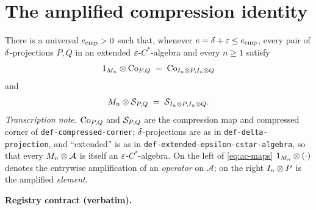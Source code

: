 \section{The amplified compression identity}\label{sec:compcb-amplified-compression}

\begin{lemma}\label{lem:compcb-amplified-compression}
There is a universal $e_{\mathrm{cmp}}>0$ such that, whenever
$e=\delta+\varepsilon\le e_{\mathrm{cmp}}$, every pair of $\delta$-projections $P,Q$ in
an extended $\varepsilon$-$C^*$-algebra and every $n\ge1$ satisfy
\begin{equation}\label{eq:ac-maps}
  1_{M_{n}}\otimes\mathrm{Co}_{P,Q}\;=\;\mathrm{Co}_{I_{n}\otimes P,I_{n}\otimes Q}
\end{equation}
and
\begin{equation}\label{eq:ac-corners}
  M_{n}\otimes \mathcal S_{P,Q}\;=\;\mathcal S_{I_{n}\otimes P,I_{n}\otimes Q} .
\end{equation}
\emph{Transcription note.} $\mathrm{Co}_{P,Q}$ and $\mathcal S_{P,Q}$ are the compression map and
compressed corner of \texttt{def-compressed-corner}; $\delta$-projections are as in
\texttt{def-delta-projection}, and ``extended'' is as in
\texttt{def-extended-epsilon-cstar-algebra}, so that every $M_{n}\otimes \mathcal A$ is
itself an $\varepsilon$-$C^*$-algebra. On the left of \eqref{eq:ac-maps} $1_{M_{n}}\otimes(\cdot)$
denotes the entrywise amplification of an \emph{operator} on $\mathcal A$; on the right
$I_{n}\otimes P$ is the amplified \emph{element}.
\end{lemma}

\noindent\textbf{Registry contract (verbatim).}

